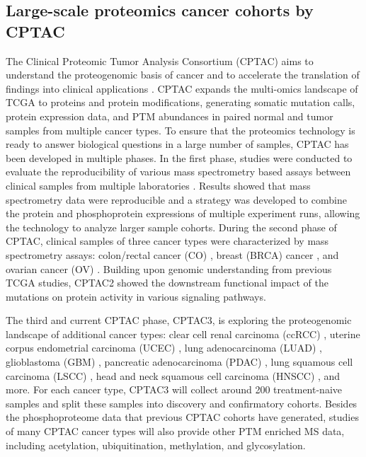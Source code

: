 \subsection{Large-scale proteomics cancer cohorts by CPTAC}
The Clinical Proteomic Tumor Analysis Consortium (CPTAC) aims to understand the proteogenomic basis of cancer and to accelerate the translation of findings into clinical applications \cite{rodriguezh_lowydr:NextHorizon2021}. CPTAC expands the multi-omics landscape of TCGA to proteins and protein modifications, generating somatic mutation calls, protein expression data, and PTM abundances in paired normal and tumor samples from multiple cancer types. To ensure that the proteomics technology is ready to answer biological questions in a large number of samples, CPTAC has been developed in multiple phases. In the first phase, studies were conducted to evaluate the reproducibility of various mass spectrometry based assays between clinical samples from multiple laboratories \cite{addonata_carrsa:MultisiteAssessment2009,rudnickpa_steinse:PerformanceMetrics2010}. Results showed that mass spectrometry data were reproducible and a strategy was developed to combine the protein and phosphoprotein expressions of multiple experiment runs, allowing the technology to analyze larger sample cohorts. During the second phase of CPTAC, clinical samples of three cancer types were characterized by mass spectrometry assays: colon/rectal cancer (CO) \cite{zhangb_thencicptac:ProteogenomicCharacterization2014}, breast (BRCA) cancer \cite{mertinsp_ncicptac:CPTACBreastCancer2016}, and ovarian cancer (OV) \cite{zhangh_townsendrr:IntegratedProteogenomic2016}. Building upon genomic understanding from previous TCGA studies, CPTAC2 showed the downstream functional impact of the mutations on protein activity in various signaling pathways.

The third and current CPTAC phase, CPTAC3, is exploring the proteogenomic landscape of additional cancer types: clear cell renal carcinoma (ccRCC) \cite{clarkdj_zhangh:IntegratedProteogenomic2019}, uterine corpus endometrial carcinoma (UCEC) \cite{douy_zhaog:CPTACUCEC2020}, lung adenocarcinoma (LUAD) \cite{vasaikars_cptac:ProteogenomicAnalysis2019}, glioblastoma (GBM) \cite{wanglb_cptac:GBM2021}, pancreatic adenocarcinoma (PDAC) \cite{caol_zhaog:ProteogenomicCharacterization2021}, lung squamous cell carcinoma (LSCC) \cite{satpathys_hanhanz:ProteogenomicPortrait2021}, head and neck squamous cell carcinoma (HNSCC) \cite{huangc_zhuj:ProteogenomicInsights2021}, and more. For each cancer type, CPTAC3 will collect around 200 treatment-naive samples and split these samples into discovery and confirmatory cohorts. Besides the phosphoproteome data that previous CPTAC cohorts have generated, studies of many CPTAC cancer types will also provide other PTM enriched MS data, including acetylation, ubiquitination, methylation, and glycosylation.



